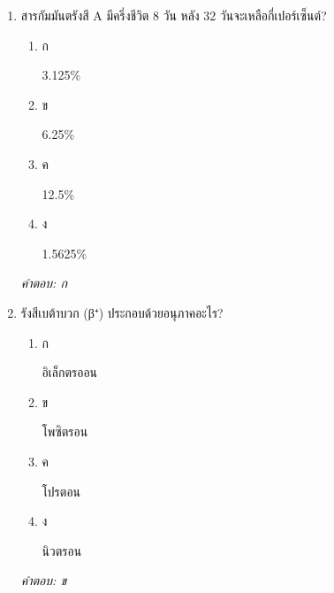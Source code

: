 \documentclass[12pt]{article}
\begin{document}
\begin{enumerate}[label=\arabic*., itemsep=0.5\baselineskip, topsep=0.5\baselineskip, leftmargin=*]
\item สารกัมมันตรังสี A มีครึ่งชีวิต 8 วัน หลัง 32 วันจะเหลือกี่เปอร์เซ็นต์?
\begin{enumerate}[label=\alph*)., itemsep=0.3\baselineskip, topsep=0.3\baselineskip]
\item ก\ 
\begin{minipage}[t]{0.9\linewidth}
\raggedright 3.125\%
\end{minipage}
\item ข\ 
\begin{minipage}[t]{0.9\linewidth}
\raggedright 6.25\%
\end{minipage}
\item ค\ 
\begin{minipage}[t]{0.9\linewidth}
\raggedright 12.5\%
\end{minipage}
\item ง\ 
\begin{minipage}[t]{0.9\linewidth}
\raggedright 1.5625\%
\end{minipage}
\end{enumerate}
\vspace{-0.3\baselineskip}
\begin{small}
\textit{คำตอบ: ก}
\end{small}

\item รังสีเบต้าบวก (β⁺) ประกอบด้วยอนุภาคอะไร?
\begin{enumerate}[label=\alph*)., itemsep=0.3\baselineskip, topsep=0.3\baselineskip]
\item ก\ 
\begin{minipage}[t]{0.9\linewidth}
\raggedright อิเล็กตรออน
\end{minipage}
\item ข\ 
\begin{minipage}[t]{0.9\linewidth}
\raggedright โพซิตรอน
\end{minipage}
\item ค\ 
\begin{minipage}[t]{0.9\linewidth}
\raggedright โปรตอน
\end{minipage}
\item ง\ 
\begin{minipage}[t]{0.9\linewidth}
\raggedright นิวตรอน
\end{minipage}
\end{enumerate}
\vspace{-0.3\baselineskip}
\begin{small}
\textit{คำตอบ: ข}
\end{small}


\end{enumerate}
\end{document}
